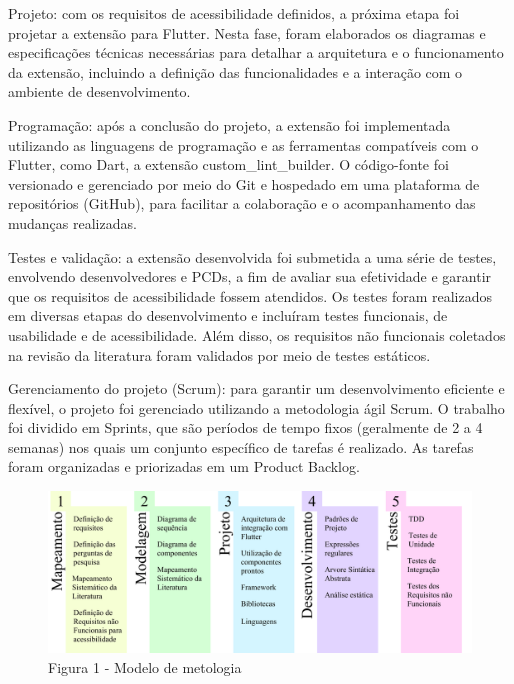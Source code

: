 Projeto: com os requisitos de acessibilidade definidos, a próxima etapa foi projetar a extensão para Flutter. Nesta fase, foram elaborados os diagramas e especificações técnicas necessárias para detalhar a arquitetura e o funcionamento da extensão, incluindo a definição das funcionalidades e a interação com o ambiente de desenvolvimento.

Programação: após a conclusão do projeto, a extensão foi implementada utilizando as linguagens de programação e as ferramentas compatíveis com o Flutter, como Dart, a extensão custom\_lint\_builder. O código-fonte foi versionado e gerenciado por meio do Git e hospedado em uma plataforma de repositórios (GitHub), para facilitar a colaboração e o acompanhamento das mudanças realizadas.

Testes e validação: a extensão desenvolvida foi submetida a uma série de testes, envolvendo desenvolvedores e PCDs, a fim de avaliar sua efetividade e garantir que os requisitos de acessibilidade fossem atendidos. Os testes foram realizados em diversas etapas do desenvolvimento e incluíram testes funcionais, de usabilidade e de acessibilidade. Além disso, os requisitos não funcionais coletados na revisão da literatura foram validados por meio de testes estáticos.

Gerenciamento do projeto (Scrum): para garantir um desenvolvimento eficiente e flexível, o projeto foi gerenciado utilizando a metodologia ágil Scrum. O trabalho foi dividido em Sprints, que são períodos de tempo fixos (geralmente de 2 a 4 semanas) nos quais um conjunto específico de tarefas é realizado. As tarefas foram organizadas e priorizadas em um Product Backlog.



\begin{figure}[!h]
	\centering
	\caption{Figura 1 - Modelo de metologia}
	\includegraphics[scale=1]{Assets/Modelo de metodologia.png}
\end{figure}



